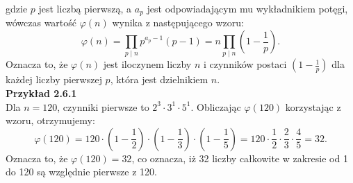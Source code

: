 \documentclass{SGGW-thesis}
\begin{document}
	gdzie \( p \) jest liczbą pierwszą, a \( a_p \) jest odpowiadającym mu wykładnikiem potęgi, wówczas wartość \( \varphi(n) \) wynika z następującego wzoru:
	\begin{equation}
		\varphi(n) = \prod_{p \mid n} p^{a_p - 1}(p - 1) = n \prod_{p \mid n} 	\left(1 - \frac{1}{p}\right).
	\end{equation}
	Oznacza to, że \( \varphi(n) \) jest iloczynem liczby \( n \) i czynników postaci \( \left(1 - \frac{1}{p}\right) \) dla każdej liczby pierwszej \( p \), która jest dzielnikiem \( n \).
	\vspace{1em}
	\\
	\noindent \textbf{Przykład 2.6.1}
	\\
	Dla \( n = 120 \), czynniki pierwsze to \( 2^3 \cdot 3^1 \cdot 5^1 \). Obliczając \( \varphi(120) \) korzystając z wzoru, otrzymujemy:
	\[ \varphi(120) = 120 \cdot \left(1 - \frac{1}{2}\right) \cdot \left(1 - \frac{1}{3}\right) \cdot \left(1 - \frac{1}{5}\right) = 120 \cdot \frac{1}{2} \cdot \frac{2}{3} \cdot \frac{4}{5} = 32. \]
	Oznacza to, że \( \varphi(120) = 32 \), co oznacza, iż 32 liczby całkowite w zakresie od 1 do 120 są względnie pierwsze z 120.
	\newpage
	
\end{document}
